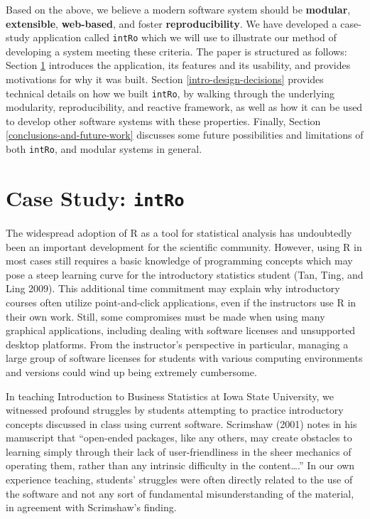 \documentclass[12pt,]{article}
\begin{document}
Based on the above, we believe a modern software system should be
\textbf{modular}, \textbf{extensible}, \textbf{web-based}, and foster
\textbf{reproducibility}. We have developed a case-study application
called \texttt{intRo} which we will use to illustrate our method of
developing a system meeting these criteria. The paper is structured as
follows: Section \ref{case-study-intro} introduces the application, its
features and its usability, and provides motivations for why it was
built. Section \ref{intro-design-decisions} provides technical details
on how we built \texttt{intRo}, by walking through the underlying
modularity, reproducibility, and reactive framework, as well as how it
can be used to develop other software systems with these properties.
Finally, Section \ref{conclusions-and-future-work} discusses some future
possibilities and limitations of both \texttt{intRo}, and modular
systems in general.

\section{\texorpdfstring{Case Study:
\texttt{intRo}}{Case Study: intRo}}\label{case-study-intro}

The widespread adoption of R as a tool for statistical analysis has
undoubtedly been an important development for the scientific community.
However, using R in most cases still requires a basic knowledge of
programming concepts which may pose a steep learning curve for the
introductory statistics student (Tan, Ting, and Ling 2009). This
additional time commitment may explain why introductory courses often
utilize point-and-click applications, even if the instructors use R in
their own work. Still, some compromises must be made when using many
graphical applications, including dealing with software licenses and
unsupported desktop platforms. From the instructor's perspective in
particular, managing a large group of software licenses for students
with various computing environments and versions could wind up being
extremely cumbersome.

In teaching Introduction to Business Statistics at Iowa State
University, we witnessed profound struggles by students attempting to
practice introductory concepts discussed in class using current
software. Scrimshaw (2001) notes in his manuscript that ``open-ended
packages, like any others, may create obstacles to learning simply
through their lack of user-friendliness in the sheer mechanics of
operating them, rather than any intrinsic difficulty in the
content\ldots{}.'' In our own experience teaching, students' struggles
were often directly related to the use of the software and not any sort
of fundamental misunderstanding of the material, in agreement with
Scrimshaw's finding.
\end{document}
